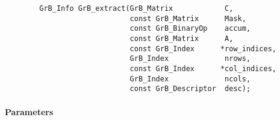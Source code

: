 \begin{verbatim}
        GrB_Info GrB_extract(GrB_Matrix            C,
                             const GrB_Matrix      Mask,
                             const GrB_BinaryOp    accum,
                             const GrB_Matrix      A,
                             const GrB_Index      *row_indices,
                             GrB_Index             nrows,
                             const GrB_Index      *col_indices,
                             GrB_Index             ncols,
                             const GrB_Descriptor  desc);
\end{verbatim}

\paragraph{Parameters}


